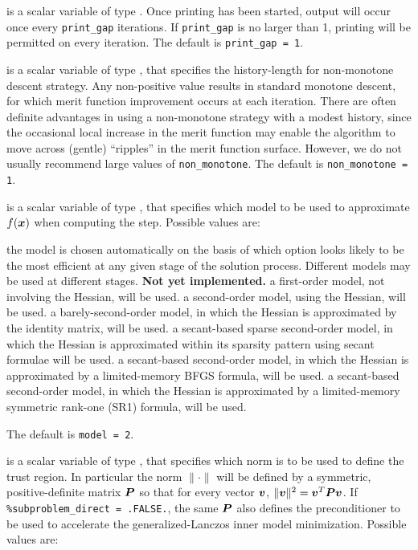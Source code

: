 \documentclass{galahad}
\begin{document}
\begin{description}
 is a scalar variable of type \integer.
Once printing has been started, output will occur once every
{\tt print\_gap} iterations. If {\tt print\_gap} is no larger than 1,
printing will be permitted on every iteration.
The default is {\tt print\_gap = 1}.

 is a scalar variable of type \integer, that
specifies the history-length for non-monotone descent strategy.
Any non-positive value results in standard monotone descent, for which
merit function improvement occurs at each iteration. There are often
definite advantages in using a non-monotone strategy with a modest history,
since the occasional local increase in the merit function may
enable the algorithm to move across (gentle) ``ripples'' in
the merit function surface.
However, we do not usually recommend large values of {\tt non\_monotone}.
The default is {\tt non\_monotone = 1}.

 is a scalar variable of type \integer, that specifies
which model to be used to approximate $f({\bm{x}})$ when computing the step.
Possible values are:

\begin{description}
 the model is chosen automatically on the basis of which option looks
        likely to be the most efficient at any given stage of the solution
        process. Different models may be used at different stages.
        {\bf Not yet implemented.}
 a first-order model, not involving the Hessian, will be used.
 a second-order model, using the Hessian, will be used.
 a barely-second-order model, in which the Hessian is approximated
        by the identity matrix, will be used.
 a secant-based sparse second-order model, in which the Hessian is
        approximated within its sparsity pattern using secant formulae will
        be used.
 a secant-based second-order model, in which the Hessian is approximated
        by a limited-memory BFGS formula, will be used.
 a secant-based second-order model, in which the Hessian is approximated
        by a limited-memory symmetric rank-one (SR1) formula, will be used.
\end{description}
The default is {\tt model = 2}.

 is a scalar variable of type \integer,
that specifies which norm is to be used to define the trust region.
In particular the norm $\|\cdot\|$ will be defined by a symmetric,
positive-definite matrix ${\bm{P}}$ so that for every vector ${\bm{v}}$,
$\|{\bm{v}}\|^2 = {\bm{v}}^T {\bm{P}} {\bm{v}}$.
If {\tt \%subproblem\_direct = .FALSE.}, the same ${\bm{P}}$ also defines the
preconditioner to be used to accelerate the generalized-Lanczos
inner model minimization.  Possible values are:


\end{description}
\end{document}
